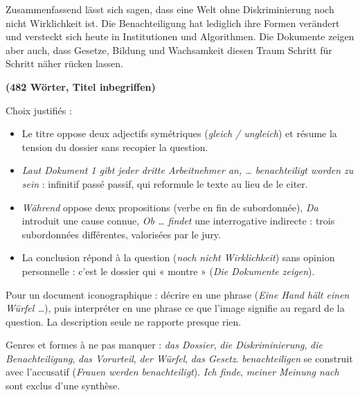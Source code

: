 \documentclass[11pt,a4paper]{article}
\providecommand{\tightlist}{\setlength{\itemsep}{0pt}\setlength{\parskip}{0pt}}
\begin{document}
Zusammenfassend lässt sich sagen, dass eine Welt ohne Diskriminierung noch nicht Wirklichkeit ist. Die Benachteiligung hat lediglich ihre Formen verändert und versteckt sich heute in Institutionen und Algorithmen. Die Dokumente zeigen aber auch, dass Gesetze, Bildung und Wachsamkeit diesen Traum Schritt für Schritt näher rücken lassen.

\textbf{(482 Wörter, Titel inbegriffen)}

Choix justifiés :

\begin{itemize}
\tightlist
\item
  Le titre oppose deux adjectifs symétriques (\emph{gleich / ungleich}) et résume la tension du dossier sans recopier la question.
\item
  \emph{Laut Dokument 1 gibt jeder dritte Arbeitnehmer an, \ldots{} benachteiligt worden zu sein} : infinitif passé passif, qui reformule le texte au lieu de le citer.
\item
  \emph{Während} oppose deux propositions (verbe en fin de subordonnée), \emph{Da} introduit une cause connue, \emph{Ob \ldots{} findet} une interrogative indirecte : trois subordonnées différentes, valorisées par le jury.
\item
  La conclusion répond à la question (\emph{noch nicht Wirklichkeit}) sans opinion personnelle : c'est le dossier qui « montre » (\emph{Die Dokumente zeigen}).
\end{itemize}

\begin{methode}

Pour un document iconographique : décrire en une phrase (\emph{Eine Hand hält einen Würfel \ldots{}}), puis interpréter en une phrase ce que l'image signifie au regard de la question. La description seule ne rapporte presque rien.

\end{methode}

\begin{piege}

Genres et formes à ne pas manquer : \emph{das Dossier}, \emph{die Diskriminierung}, \emph{die Benachteiligung}, \emph{das Vorurteil}, \emph{der Würfel}, \emph{das Gesetz}. \emph{benachteiligen} se construit avec l'accusatif (\emph{Frauen werden benachteiligt}). \emph{Ich finde}, \emph{meiner Meinung nach} sont exclus d'une synthèse.

\end{piege}
\end{document}
